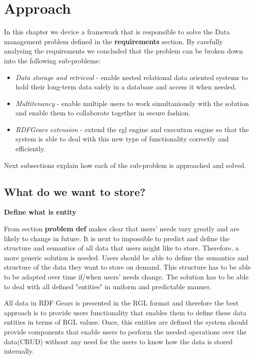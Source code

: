 \documentclass[a4paper, notitlepage]{article}
\begin{document}
\section{Approach}
In this chapter we device a framework that is responsible to solve the Data management problem defined in the \textbf{requirements} section. By carefully analysing the requirements we concluded that the problem can be broken down into the following sub-problems:
\begin{itemize}
	\item \textit{Data storage and retrieval} - enable nested relational data oriented systems to hold their long-term data safely in a database and access it when needed.
	\item \textit{Multitenancy} - enable multiple users to work simultaniously with the solution and enable them to collaborate together in secure fashion.
	\item \textit{RDFGears extension} - extend the rgl engine and execution engine so that the system is able to deal with this new type of functionality correctly and efficiently.
\end{itemize}

Next subsections explain how each of the sub-problem is approached and solved.

\subsection{What do we want to store?}

\textbf{Define what is entity}

From section \textbf{problem def} makes clear that users' needs vary greatly and are likely to change in future. It is next to impossible to predict and define the structure and semantics of all data that users might like to store. Therefore, a more generic solution is needed. Users should be able to define the semantics and structure of the data they want to store on demand. This structure has to be able to be adapted over time if/when users' needs change. The solution has to be able to deal with all defined "entities" in uniform and predictable manner.   

All data in RDF Gears is presented in the RGL format and therefore the best approach is to provide users functionality that enables them to define these data entities in terms of RGL values. Once, this entities are defined the system should provide components that enable users to perform the needed operations over the data(CRUD) without any need for the users to know how the data is stored internally.
\end{document}
